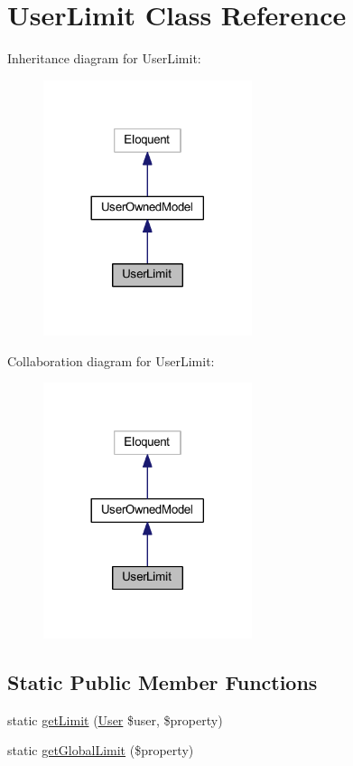 \hypertarget{class_user_limit}{}\section{User\+Limit Class Reference}
\label{class_user_limit}


Inheritance diagram for User\+Limit\+:
\nopagebreak
\begin{figure}[H]
\begin{center}
\leavevmode
\includegraphics[width=173pt]{class_user_limit__inherit__graph}
\end{center}
\end{figure}


Collaboration diagram for User\+Limit\+:
\nopagebreak
\begin{figure}[H]
\begin{center}
\leavevmode
\includegraphics[width=173pt]{class_user_limit__coll__graph}
\end{center}
\end{figure}
\subsection*{Static Public Member Functions}
\begin{DoxyCompactItemize}
\item 
static \hyperlink{class_user_limit_a9c0c377998b6523c638305234cc21640}{get\+Limit} (\hyperlink{class_user}{User} \$user, \$property)
\item 
static \hyperlink{class_user_limit_a07e659c34d21c2706d33945e3ca0c418}{get\+Global\+Limit} (\$property)
\end{DoxyCompactItemize}
